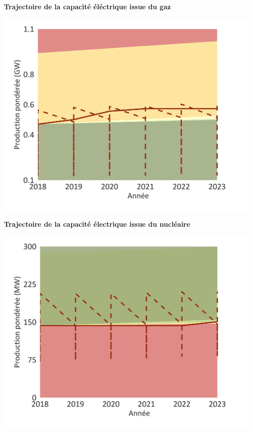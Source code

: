 \documentclass[10pt,table,a4]{article}\usepackage[]{graphicx}\usepackage[]{color}
\begin{document}
	\hspace{.02\linewidth}
	\begin{minipage}[t]{.49\textwidth}
			\begin{center}
		\textbf{Trajectoire de la capacité éléctrique issue du gaz}
			\end{center}
		\includegraphics[trim = {0 0cm 0 0},width=1\linewidth]{ReportOutputs/Fig19}
		
		
		\vspace{0.1cm}
			\begin{center}
		\textbf{Trajectoire de la capacité électrique issue du nucléaire} 
		\newline
			\end{center}
		\includegraphics[trim = {0 0cm 0 0},width=1\linewidth]{ReportOutputs/Fig20}
		
		
	\end{minipage}
	
\end{document}
